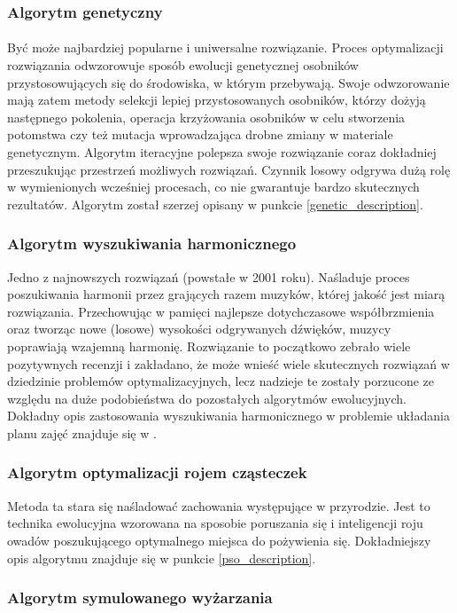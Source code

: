 \subsubsection{Algorytm genetyczny}
\paragraph{} Być może najbardziej popularne i uniwersalne rozwiązanie. Proces optymalizacji rozwiązania odwzorowuje sposób ewolucji genetycznej osobników przystosowujących się do środowiska, w którym przebywają. Swoje odwzorowanie mają zatem metody selekcji lepiej przystosowanych osobników, którzy dożyją następnego pokolenia, operacja krzyżowania osobników w celu stworzenia potomstwa czy też mutacja wprowadzająca drobne zmiany w materiale genetycznym. Algorytm iteracyjne polepsza swoje rozwiązanie coraz dokładniej przeszukując przestrzeń możliwych rozwiązań. Czynnik losowy odgrywa dużą rolę w wymienionych wcześniej procesach, co nie gwarantuje bardzo skutecznych rezultatów. Algorytm został szerzej opisany w punkcie \ref{genetic_description}.
\subsubsection{Algorytm wyszukiwania harmonicznego}
Jedno z najnowszych rozwiązań (powstałe w 2001 roku). Naśladuje proces poszukiwania harmonii przez grających razem muzyków, której jakość jest miarą rozwiązania. Przechowując w pamięci najlepsze dotychczasowe współbrzmienia oraz tworząc nowe (losowe) wysokości odgrywanych dźwięków, muzycy poprawiają wzajemną harmonię. Rozwiązanie to początkowo zebrało wiele pozytywnych recenzji i zakładano, że może wnieść wiele skutecznych rozwiązań w dziedzinie problemów optymalizacyjnych, lecz nadzieje te zostały porzucone ze względu na duże podobieństwa do pozostałych algorytmów ewolucyjnych. Dokładny opis zastosowania wyszukiwania harmonicznego w problemie układania planu zajęć znajduje się w \cite{harmony_search}.
\subsubsection{Algorytm optymalizacji rojem cząsteczek}
Metoda ta stara się naśladować zachowania występujące w przyrodzie. Jest to technika ewolucyjna wzorowana na sposobie poruszania się i inteligencji roju owadów poszukującego optymalnego miejsca do pożywienia się. Dokładniejszy opis algorytmu znajduje się w punkcie \ref{pso_description}.

\subsubsection{Algorytm symulowanego wyżarzania}
